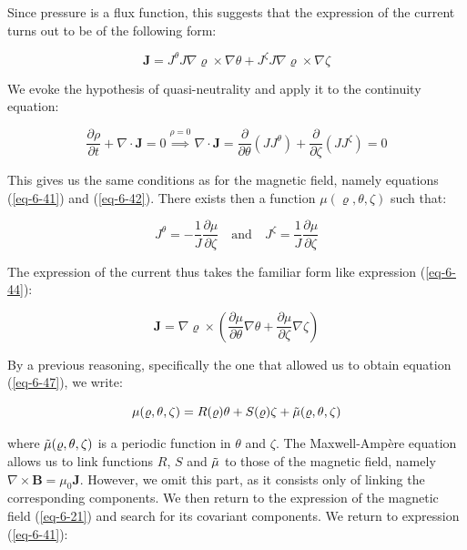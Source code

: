Since pressure is a flux function, this suggests that the expression of the current turns out to be of the following form:

\begin{equation}
    \mathbf{J}=J^{\theta} J\nabla\varrho\times\nabla\theta+J^{\zeta}J\nabla\varrho\times\nabla\zeta
\end{equation}

We evoke the hypothesis of quasi-neutrality and apply it to the continuity equation:

\begin{equation}
    \frac{\partial\rho}{\partial t}+\nabla\cdot\mathbf{J}=0\stackrel{\rho=0}{\implies}\nabla\cdot\mathbf{J}=\frac{\partial}{\partial\theta}(JJ^{\theta})+\frac{\partial}{\partial\zeta}(JJ^{\zeta})=0
\end{equation}

This gives us the same conditions as for the magnetic field, namely equations (\ref{eq-6-41}) and (\ref{eq-6-42}). There exists then a function $\mu(\varrho, \theta, \zeta)$ such that:

\begin{equation}
    J^{\theta}=-\frac{1}{J}\frac{\partial\mu}{\partial\zeta}\quad\text{and}\quad J^{\zeta}=\frac{1}{J}\frac{\partial\mu}{\partial\zeta}
\end{equation}

The expression of the current thus takes the familiar form like expression (\ref{eq-6-44}):

\begin{equation}
    \mathbf{J}=\nabla\varrho\times\left(\frac{\partial\mu}{\partial\theta}\nabla\theta+\frac{\partial\mu}{\partial\zeta}\nabla\zeta\right)
\end{equation}

By a previous reasoning, specifically the one that allowed us to obtain equation (\ref{eq-6-47}), we write:

\begin{equation}
    \label{eq-5-64}
    \mu(\varrho, \theta, \zeta)=R(\varrho)\theta+S(\varrho)\zeta+\Tilde{\mu}(\varrho, \theta, \zeta)
\end{equation}

where $\Tilde{\mu}(\varrho, \theta, \zeta)$ is a periodic function in $\theta$ and $\zeta$. The Maxwell-Ampère equation allows us to link functions $R$, $S$ and $\Tilde{\mu}$ to those of the magnetic field, namely $\nabla\times\mathbf{B}=\mu_0\mathbf{J}$. However, we omit this part, as it consists only of linking the corresponding components. We then return to the expression of the magnetic field (\ref{eq-6-21}) and search for its covariant components. We return to expression (\ref{eq-6-41}):

